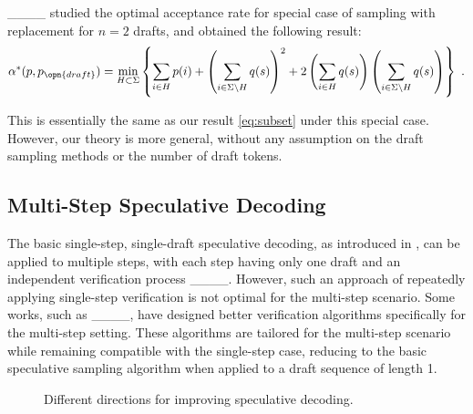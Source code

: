 ____ studied the optimal acceptance rate for special case of sampling with replacement for $n=2$ drafts, and obtained the following result:
\begin{equation}
\alpha^\ast(p,p_{\opn{draft}}) = \min_{H \subset\Sigma} \left\{
\sum_{i\in H} p(i)+\left(\sum_{i\in \Sigma\setminus H} q(s)\right)^2+2\left(\sum_{i\in H} q(s)\right)\left(\sum_{i\in \Sigma\setminus H} q(s)\right)
\right\}
~.
\end{equation}

This is essentially the same as our result \eqref{eq:subset} under this special case. 
However, our theory is more general, without any assumption on the draft sampling methods or the number of draft tokens.

\subsection{Multi-Step Speculative Decoding}\label{sec:related_multi_step}
The basic single-step, single-draft speculative decoding, as introduced in , can be applied to multiple steps, with each step having only one draft and an independent verification process ____. However, such an approach of repeatedly applying single-step verification is not optimal for the multi-step scenario. Some works, such as ____, have designed better verification algorithms specifically for the multi-step setting. These algorithms are tailored for the multi-step scenario while remaining compatible with the single-step case, reducing to the basic speculative sampling algorithm when applied to a draft sequence of length 1.

\begin{figure}[h]
\centering
{}

\caption{Different directions for improving speculative decoding.}
\label{fig:related_work}
\end{figure}


